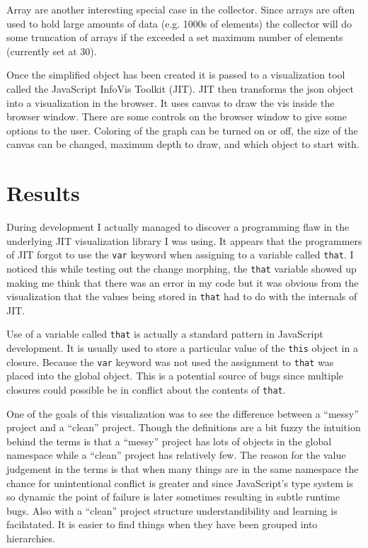 \documentclass{article}
\begin{document}
Array are another interesting special case in the collector. Since arrays are often used to hold large amounts of data (e.g. 1000s of elements) the collector will do some truncation of arrays if the exceeded a set maximum number of elements (currently set at 30).

Once the simplified object has been created it is passed to a visualization tool called the JavaScript InfoVis Toolkit (JIT). JIT then transforms the json object into a visualization in the browser. It uses canvas to draw the vis inside the browser window. There are some controls on the browser window to give some options to the user. Coloring of the graph can be turned on or off, the size of the canvas can be changed, maximum depth to draw, and which object to start with.


\section{Results}
During development I actually managed to discover a programming flaw in the underlying JIT visualization library I was using. It appears that the programmers of JIT forgot to use the {\tt var} keyword when assigning to a variable called {\tt that}. I noticed this while testing out the change morphing, the {\tt that} variable showed up making me think that there was an error in my code but it was obvious from the visualization that the values being stored in {\tt that} had to do with the internals of JIT.

Use of a variable called {\tt that} is actually a standard pattern in JavaScript development. It is usually used to store a particular value of the {\tt this} object in a closure. Because the {\tt var} keyword was not used the assignment to {\tt that} was placed into the global object. This is a potential source of bugs since multiple closures could possible be in conflict about the contents of {\tt that}.


One of the goals of this visualization was to see the difference between a ``messy'' project and a ``clean'' project. Though the definitions are a bit fuzzy the intuition behind the terms is that a ``messy'' project has lots of objects in the global namespace while a ``clean'' project has relatively few. The reason for the value judgement in the terms is that when many things are in the same namespace the chance for unintentional conflict is greater and since JavaScript's type system is so dynamic the point of failure is later sometimes resulting in subtle runtime bugs. Also with a ``clean'' project structure understandibility and learning is facilatated. It is easier to find things when they have been grouped into hierarchies.
\end{document}
